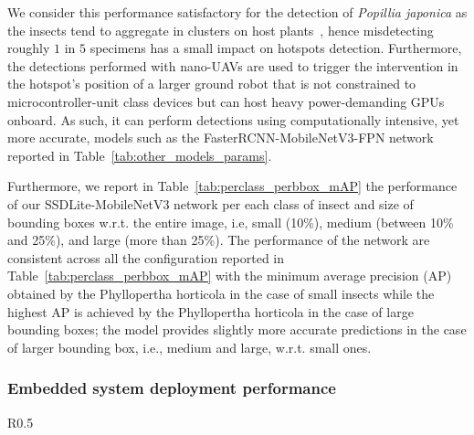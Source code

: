 We consider this performance satisfactory for the detection of \textit{Popillia japonica} as the insects tend to aggregate in clusters on host plants~\citep{eppo-popillia}, hence misdetecting roughly $1$ in $5$ specimens has a small impact on hotspots detection.
Furthermore, the detections performed with nano-UAVs are used to trigger the intervention in the hotspot's position of a larger ground robot that is not constrained to microcontroller-unit class devices but can host heavy power-demanding GPUs onboard. 
As such, it can perform detections using computationally intensive, yet more accurate, models such as the FasterRCNN-MobileNetV3-FPN network reported in Table~\ref{tab:other_models_params}.

Furthermore, we report in Table~\ref{tab:perclass_perbbox_mAP} the performance of our SSDLite-MobileNetV3 network per each class of insect and size of bounding boxes w.r.t. the entire image, i.e, small (10\%), medium (between 10\% and 25\%), and large (more than 25\%).
The performance of the network are consistent across all the configuration reported in Table~\ref{tab:perclass_perbbox_mAP} with the minimum average precision (AP) obtained by the Phyllopertha horticola in the case of small insects while the highest AP is achieved by the Phyllopertha horticola in the case of large bounding boxes; the model provides slightly more accurate predictions in the case of larger bounding box, i.e., medium and large, w.r.t. small ones.




\subsubsection{Embedded system deployment performance}

\begin{wraptable}{R}{0.5\textwidth}
    \small\centering
    \caption{GAP9 SoC configurations.}
    \label{tab:configurationsGAP9}
\end{wraptable}


